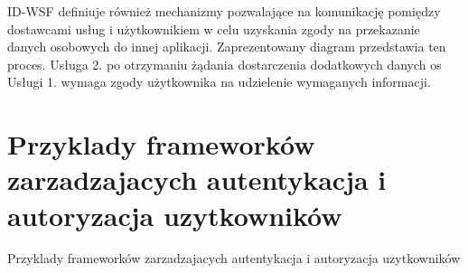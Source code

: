 	ID-WSF definiuje również mechanizmy pozwalające na komunikację pomiędzy dostawcami usług i użytkownikiem w celu uzyskania zgody na przekazanie danych osobowych do innej aplikacji. Zaprezentowany diagram przedstawia ten proces. Usługa 2. po otrzymaniu żądania dostarczenia dodatkowych danych os Usługi 1. wymaga zgody użytkownika na udzielenie wymaganych informacji.
	

\section{Przyklady frameworków zarzadzajacych autentykacja i autoryzacja uzytkowników}
\label{sec:frameworki}

Przyklady frameworków zarzadzajacych autentykacja i autoryzacja uzytkowników

